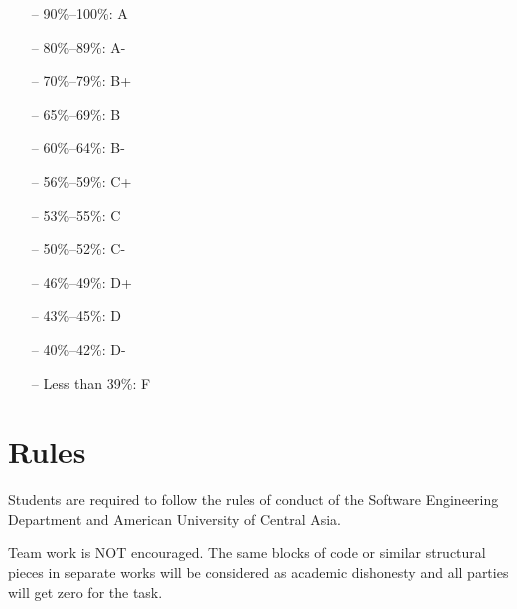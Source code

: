\documentclass[12pt,a4paper,oneside]{article}
\begin{document}
        \begin{itemize} \itemsep-10pt \parskip0pt 
            \item[--] 90\%--100\%: A\\
            \item[--] 80\%--89\%: A-\\
            \item[--] 70\%--79\%: B+\\
            \item[--] 65\%--69\%: B\\
            \item[--] 60\%--64\%: B-\\
            \item[--] 56\%--59\%: C+\\
            \item[--] 53\%--55\%: C\\
            \item[--] 50\%--52\%: C-\\
            \item[--] 46\%--49\%: D+\\
            \item[--] 43\%--45\%: D\\
            \item[--] 40\%--42\%: D-\\
            \item[--] Less than 39\%: F
        \end{itemize}

    \section{Rules}

        Students are required to follow the rules of conduct of the Software
        Engineering Department and American University of Central Asia.

        Team work is NOT encouraged. The same blocks of code or similar
        structural pieces in separate works will be considered as academic
        dishonesty and all parties will get zero for the task.
\end{document}
